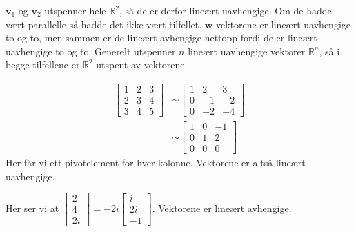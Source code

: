 \documentclass[11pt, a4paper, norsk]{NTNUoving}
\begin{document}
\begin{oppgave}[1]
    $\textbf{v}_1$ og $\textbf{v}_2$ utspenner hele $\mathbb{R}^2$, så de er derfor lineært uavhengige. Om de hadde vært parallelle så hadde det ikke vært tilfellet. $\textbf{w}$-vektorene er lineært uavhengige to og to, men sammen er de lineært avhengige nettopp fordi de er lineært uavhengige to og to. Generelt utspenner $n$ lineært uavhengige vektorer $\mathbb{R}^n$, så i begge tilfellene er $\mathbb{R}^2$ utspent av vektorene.
\end{oppgave}

\begin{oppgave}
    \begin{punkt}
        \begin{align*}
            \left[
                \begin{array}{cc|c}
                   1 & 2 & 3\\
                    2 & 3 & 4\\
                    3 & 4 & 5
                \end{array}
            \right]  
            &\sim
            \left[
                \begin{array}{cc|c}
                    1 & 2 & 3\\
                    0 & -1 & -2\\
                    0 & -2 & -4
                \end{array}
            \right]
            \\&\sim
            \left[
                \begin{array}{cc|c}
                    1 & 0 & -1\\
                    0 & 1 & 2\\
                    0 & 0 & 0
                \end{array}
            \right]
        \end{align*}
        Her får vi ett pivotelement for hver kolonne. Vektorene er altså lineært uavhengige.
    \end{punkt}
    
    \begin{punkt}
        Her ser vi at $\begin{bmatrix} 2\\ 4\\ 2i \end{bmatrix} = -2i\begin{bmatrix} i\\ 2i\\ -1\end{bmatrix}$. Vektorene er lineært avhengige.
    \end{punkt}
\end{oppgave}
\end{document}
